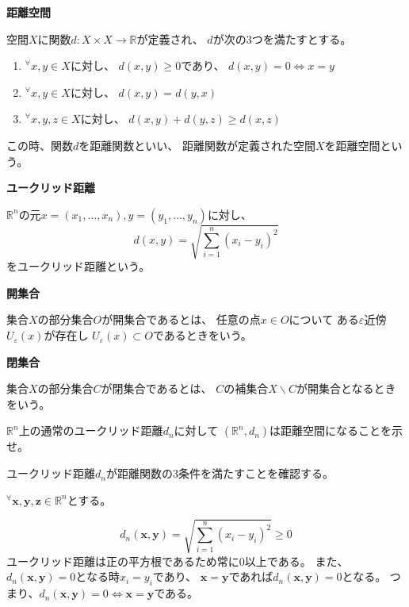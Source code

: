 \documentclass[12pt,b5paper]{ltjsarticle}
\begin{document}
\textbf{距離空間}

空間$X$に関数$d:X\times X \to \mathbb{R}$が定義され、
$d$が次の3つを満たすとする。
\begin{enumerate}
 \item
      ${}^{\forall}x,y\in X$に対し、
      $d(x,y)\geq 0$であり、
      $d(x,y)=0 \Leftrightarrow x=y$

 \item
      ${}^{\forall}x,y\in X$に対し、
      $d(x,y)=d(y,x)$

 \item
      ${}^{\forall}x,y,z\in X$に対し、
      $d(x,y)+d(y,z)\geq d(x,z)$
\end{enumerate}

この時、関数$d$を距離関数といい、
距離関数が定義された空間$X$を距離空間という。


\textbf{ユークリッド距離}

$\mathbb{R}^n$の元$x=(x_1,\dots,x_n), y=(y_1,\dots,y_n)$に対し、
\begin{equation}
 d(x,y)=\sqrt{\sum_{i=1}^{n}(x_i - y_i)^2}
\end{equation}
をユークリッド距離という。


\textbf{開集合}

集合$X$の部分集合$O$が開集合であるとは、
任意の点$x\in O$について
ある$\varepsilon$近傍$U_{\varepsilon}(x)$が存在し
$U_{\varepsilon}(x)\subset O$であるときをいう。


\textbf{閉集合}

集合$X$の部分集合$C$が閉集合であるとは、
$C$の補集合$X\backslash C$が開集合となるときをいう。



\hrulefill



\hrulefill


$\mathbb{R}^n$上の通常のユークリッド距離$d_n$に対して
$(\mathbb{R}^n,d_n)$は距離空間になることを示せ。

\dotfill

ユークリッド距離$d_n$が距離関数の3条件を満たすことを確認する。

${}^{\forall}\bm{x},\bm{y},\bm{z}\in\mathbb{R}^n$とする。

\begin{equation}
 d_n(\bm{x},\bm{y}) = \sqrt{\sum_{i=1}^{n}(x_i - y_i)^2} \geq 0
\end{equation}
ユークリッド距離は正の平方根であるため常に0以上である。
また、$d_n(\bm{x},\bm{y})=0$となる時$x_i=y_i$であり、
$\bm{x}=\bm{y}$であれば$d_n(\bm{x},\bm{y})=0$となる。
つまり、$d_n(\bm{x},\bm{y})=0 \Leftrightarrow \bm{x}=\bm{y}$である。
\end{document}
